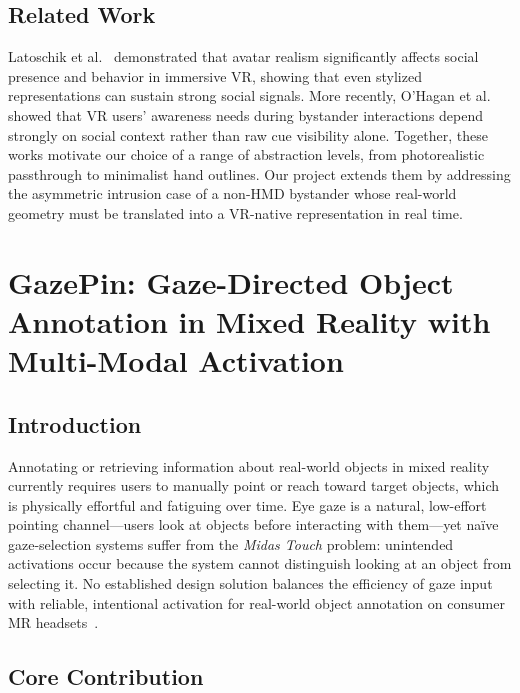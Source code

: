 \documentclass{styling/vgtc}                          %
\begin{document}
\subsection{Related Work}

Latoschik et al.~\cite{latoschik2017avatar} demonstrated that avatar
realism significantly affects social presence and behavior in immersive VR,
showing that even stylized representations can sustain strong social
signals. More recently, O'Hagan et al.~\cite{ohagan2023bystander} showed that
VR users' awareness needs during bystander interactions depend strongly on
social context rather than raw cue visibility alone. Together, these works
motivate our choice of a range of abstraction levels, from photorealistic
passthrough to minimalist hand outlines. Our project extends them by
addressing the asymmetric intrusion case of a non-HMD bystander whose
real-world geometry must be translated into a VR-native representation in
real time.

\section{GazePin: Gaze-Directed Object Annotation in Mixed Reality with Multi-Modal Activation}

\subsection{Introduction}

Annotating or retrieving information about real-world objects in mixed
reality currently requires users to manually point or reach toward target
objects, which is physically effortful and fatiguing over time. Eye gaze is
a natural, low-effort pointing channel---users look at objects before
interacting with them---yet na\"{i}ve gaze-selection systems suffer from the
\emph{Midas Touch} problem: unintended activations occur because the system
cannot distinguish looking at an object from selecting it. No established
design solution balances the efficiency of gaze input with reliable,
intentional activation for real-world object annotation on consumer MR
headsets~\cite{pfeuffer2023palmgazer}.

\subsection{Core Contribution}
\end{document}
